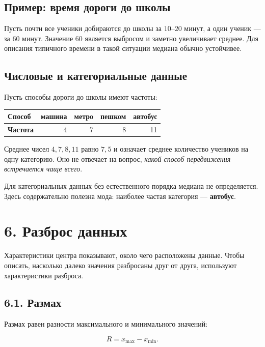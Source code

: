 \documentclass[a4paper,12pt]{article}
\newcommand{\key}[1]{\textcolor{darkaccent}{\textbf{#1}}}
\begin{document}
\subsection*{Пример: время дороги до школы}

Пусть почти все ученики добираются до школы за $10$--$20$ минут, а один ученик --- за $60$ минут. Значение $60$ является выбросом и заметно увеличивает среднее. Для описания типичного времени в такой ситуации медиана обычно устойчивее.

\subsection*{Числовые и категориальные данные}

Пусть способы дороги до школы имеют частоты:

\begin{center}
\begin{tabular}{@{}lrrrr@{}}
\toprule
\textbf{Способ} & машина & метро & пешком & автобус \\
\midrule
\textbf{Частота} & 4 & 7 & 8 & 11 \\
\bottomrule
\end{tabular}
\end{center}

Среднее чисел $4,7,8,11$ равно $7{,}5$ и означает среднее количество учеников на одну категорию. Оно не отвечает на вопрос, \textit{какой способ передвижения встречается чаще всего}.

Для категориальных данных без естественного порядка медиана не определяется. Здесь содержательно полезна мода: наиболее частая категория --- \key{автобус}.

\section*{6. Разброс данных}

Характеристики центра показывают, около чего расположены данные. Чтобы описать, насколько далеко значения разбросаны друг от друга, используют характеристики разброса.

\subsection*{6.1. Размах}

Размах равен разности максимального и минимального значений:

\[
R=x_{\max}-x_{\min}.
\]
\end{document}
